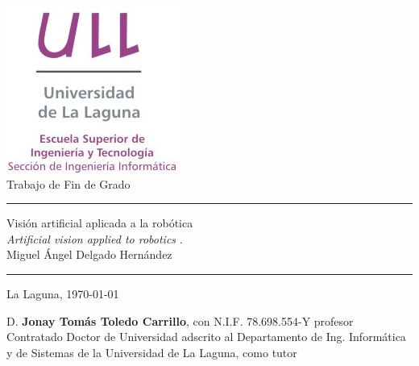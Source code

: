 \documentclass[spanish,a4paper,14pt,oneside]{extreport}
\begin{document}

\pagestyle{empty}
\thispagestyle{empty}


\newcommand{\HRule}{\rule{\linewidth}{1mm}}
\setlength{\parindent}{0mm}
\setlength{\parskip}{10pt}


\begin{center}
\includegraphics[scale=0.8]{images/logo_vertical}\\[10mm]
{\Huge Trabajo de Fin de Grado}
\end{center}

\HRule
\begin{flushright}
        {\Huge Visión artificial aplicada a la robótica} \\[2.5mm]
        {\Large \textit{Artificial vision applied to robotics} .} \\[5mm]
        {\Large Miguel Ángel Delgado Hernández} \\[5mm]


\end{flushright}
\HRule
{}
\begin{center}
  \Large La Laguna, \today
\end{center}

\setlength{\parindent}{5mm}

\newpage
\thispagestyle{empty}

D. {\bf Jonay Tomás Toledo Carrillo}, con N.I.F. 78.698.554-Y
profesor
Contratado Doctor de Universidad
adscrito al Departamento
de Ing. Informática y de Sistemas
de la Universidad de La Laguna, como tutor
\end{document}
